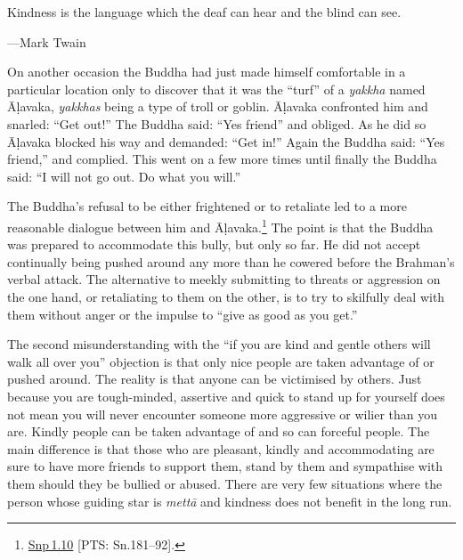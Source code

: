 \documentclass[10pt, openright]{book}
\newenvironment{epigram-2}%
{%
\setstretch{1.4}
\vspace{1em}
\noindent
\quoting[leftmargin=2cm,rightmargin=2cm]%
\begin{itshape}
\large
}%
{\end{itshape}\endquoting
}%
\newenvironment{epigram-2-cite}%
{%
\quoting[leftmargin=2cm,rightmargin=2cm]%
\noindent\normal\hspace*{\fill} 
}%
{\endquoting
}%
\begin{document}
\begin{epigram-2}
Kindness is the language which the deaf can hear and the blind can see.
\end{epigram-2}
\begin{epigram-2-cite}
—Mark Twain
\end{epigram-2-cite}

On another occasion the Buddha had just made himself comfortable in a particular location only to discover that it was the “turf” of a \textit{yakkha} named Āḷavaka, \textit{yakkhas} being a type of troll or goblin. Āḷavaka confronted him and snarled: “Get out!” The Buddha said: “Yes friend” and obliged. As he did so Āḷavaka blocked his way and demanded: “Get in!” Again the Buddha said: “Yes friend,” and complied. This went on a few more times until finally the Buddha said: “I will not go out. Do what you will.”


The Buddha’s refusal to be either frightened or to retaliate led to a more reasonable dialogue between him and Āḷavaka.\footnote {\href{https://suttacentral.net/snp1.10/en/sujato}{Snp 1.10} [PTS: Sn.181–92].} The point is that the Buddha was prepared to accommodate this bully, but only so far. He did not accept continually being pushed around any more than he cowered before the Brahman’s verbal attack. The alternative to meekly submitting to threats or aggression on the one hand, or retaliating to them on the other, is to try to skilfully deal with them without anger or the impulse to “give as good as you get.”


The second misunderstanding with the “if you are kind and gentle others will walk all over you” objection is that only nice people are taken advantage of or pushed around. The reality is that anyone can be victimised by others. Just because you are tough-minded, assertive and quick to stand up for yourself does not mean you will never encounter someone more aggressive or wilier than you are. Kindly people can be taken advantage of and so can forceful people. The main difference is that those who are pleasant, kindly and accommodating are sure to have more friends to support them, stand by them and sympathise with them should they be bullied or abused. There are very few situations where the person whose guiding star is \textit{mettā} and kindness does not benefit in the long run.
\end{document}
